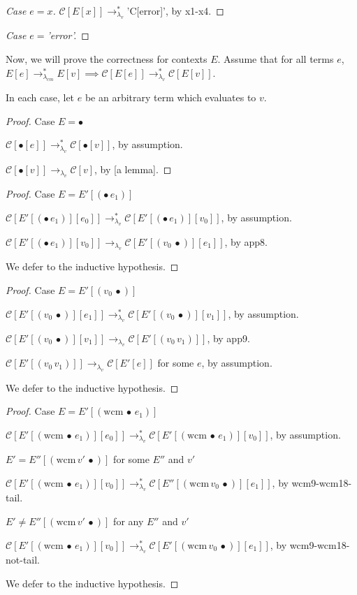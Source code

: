 \documentclass[ms,electronic,twosidetoc,letterpaper,chaptercenter,parttop]{byumsphd}
\newcommand{\lvrr}{\rightarrow_{\lambda_v}}
\newcommand{\lvrrs}{\rightarrow_{\lambda_v}^{*}}
\newcommand{\cmrrs}{\rightarrow_{\lambda_{cm}}^{*}}
\newcommand{\C}[1]{\mathcal{C}[#1]}
\newcommand{\app}[2]{(#1\,#2)}
\newcommand{\wcm}[2]{(\mathrm{wcm}\,#1\,#2)}
\newcommand{\hole}{\bullet}
\begin{document}
\begin{proof}[Case $e=x$]
$\C{E[x]}\lvrrs$\scheme'C[error]', by x1-x4.
\end{proof}

\begin{proof}[Case $e=$\scheme'error']
\end{proof}

Now, we will prove the correctness for contexts $E$. Assume that for all terms $e$,
$E[e]\cmrrs E[v]\implies\C{E[e]}\lvrrs \C{E[v]}$.

In each case, let $e$ be an arbitrary term which evaluates to $v$.

\begin{proof}{Case $E=\hole$}

$\C{\hole[e]}\lvrrs\C{\hole[v]}$, by assumption.

$\C{\hole[v]}\lvrr\C{v}$, by [a lemma].
\end{proof}

\begin{proof}{Case $E=E'[\app{\hole}{e_1}]$}

$\C{E'[\app{\hole}{e_1}][e_0]}\lvrrs\C{E'[\app{\hole}{e_1}][v_0]}$, by assumption.

$\C{E'[\app{\hole}{e_1}][v_0]}\lvrr\C{E'[\app{v_0}{\hole}][e_1]}$, by app8.

We defer to the inductive hypothesis.
\end{proof}

\begin{proof}{Case $E=E'[\app{v_0}{\hole}]$}

$\C{E'[\app{v_0}{\hole}][e_1]}\lvrrs\C{E'[\app{v_0}{\hole}][v_1]}$, by assumption.

$\C{E'[\app{v_0}{\hole}][v_1]}\lvrr\C{E'[\app{v_0}{v_1}]}$, by app9.

$\C{E'[\app{v_0}{v_1}]}\lvrr\C{E'[e]}$ for some $e$, by assumption.

We defer to the inductive hypothesis.
\end{proof}

\begin{proof}{Case $E=E'[\wcm{\hole}{e_1}]$}

$\C{E'[\wcm{\hole}{e_1}][e_0]}\lvrrs\C{E'[\wcm{\hole}{e_1}][v_0]}$, by assumption.

\begin{case}{$E'=E''[\wcm{v'}{\hole}]$ for some $E''$ and $v'$}

$\C{E'[\wcm{\hole}{e_1}][v_0]}\lvrrs\C{E''[\wcm{v_0}{\hole}][e_1]}$, by wcm9-wcm18-tail.
\end{case}

\begin{case}{$E'\ne E''[\wcm{v'}{\hole}]$ for any $E''$ and $v'$}

$\C{E'[\wcm{\hole}{e_1}][v_0]}\lvrrs\C{E'[\wcm{v_0}{\hole}][e_1]}$, by wcm9-wcm18-not-tail.
\end{case}

We defer to the inductive hypothesis.
\end{proof}
\end{document}
